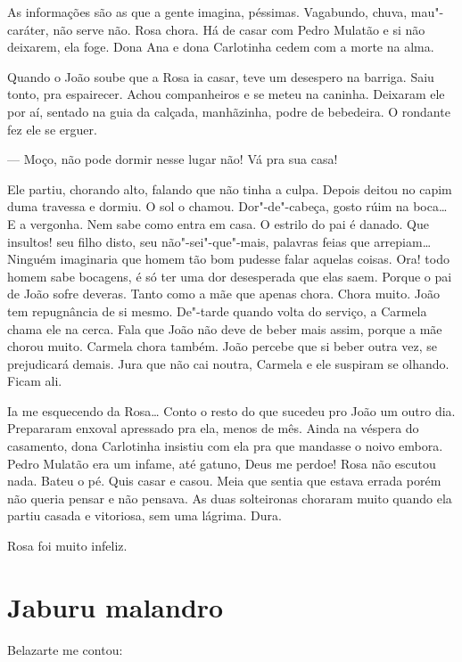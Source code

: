 As informações são as que a gente imagina, péssimas. Vagabundo, chuva,
mau"-caráter, não serve não. Rosa chora. Há de casar com Pedro Mulatão e
si não deixarem, ela foge. Dona Ana e dona Carlotinha cedem com a morte
na alma.

Quando o João soube que a Rosa ia casar, teve um desespero na barriga.
Saiu tonto, pra espairecer. Achou companheiros e se meteu na caninha.
Deixaram ele por aí, sentado na guia da calçada, manhãzinha, podre de
bebedeira. O rondante fez ele se erguer.

--- Moço, não pode dormir nesse lugar não! Vá pra sua casa!

Ele partiu, chorando alto, falando que não tinha a culpa. Depois deitou
no capim duma travessa e dormiu. O sol o chamou. Dor"-de"-cabeça, gosto
rúim na boca\ldots{} E a vergonha. Nem sabe como entra em casa. O estrilo do
pai é danado. Que insultos! seu filho disto, seu não"-sei"-que"-mais,
palavras feias que arrepiam\ldots{} Ninguém imaginaria que homem tão bom
pudesse falar aquelas coisas. Ora! todo homem sabe bocagens, é só ter
uma dor desesperada que elas saem. Porque o pai de João sofre deveras.
Tanto como a mãe que apenas chora. Chora muito. João tem repugnância de
si mesmo. De"-tarde quando volta do serviço, a Carmela chama ele na
cerca. Fala que João não deve de beber mais assim, porque a mãe chorou
muito. Carmela chora também. João percebe que si beber outra vez, se
prejudicará demais. Jura que não cai noutra, Carmela e ele suspiram se
olhando. Ficam ali.

Ia me esquecendo da Rosa\ldots{} Conto o resto do que sucedeu pro João um
outro dia. Prepararam enxoval apressado pra ela, menos de mês. Ainda na
véspera do casamento, dona Carlotinha insistiu com ela pra que mandasse
o noivo embora. Pedro Mulatão era um infame, até gatuno, Deus me perdoe!
Rosa não escutou nada. Bateu o pé. Quis casar e casou. Meia que sentia
que estava errada porém não queria pensar e não pensava. As duas
solteironas choraram muito quando ela partiu casada e vitoriosa, sem uma
lágrima. Dura.

Rosa foi muito infeliz.

\chapter{Jaburu malandro}

Belazarte me contou:

